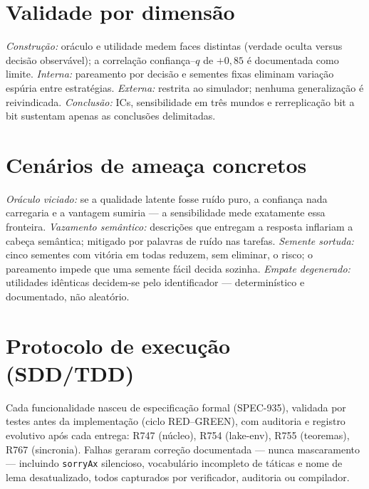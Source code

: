 \section{Validade por dimensão}
\textit{Construção:} oráculo e utilidade medem faces distintas (verdade oculta versus decisão observável); a correlação confiança--$q$ de $+0{,}85$ é documentada como limite. \textit{Interna:} pareamento por decisão e sementes fixas eliminam variação espúria entre estratégias. \textit{Externa:} restrita ao simulador; nenhuma generalização é reivindicada. \textit{Conclusão:} ICs, sensibilidade em três mundos e rerreplicação bit a bit sustentam apenas as conclusões delimitadas.
\section{Cenários de ameaça concretos}
\textit{Oráculo viciado:} se a qualidade latente fosse ruído puro, a confiança nada carregaria e a vantagem sumiria --- a sensibilidade mede exatamente essa fronteira. \textit{Vazamento semântico:} descrições que entregam a resposta inflariam a cabeça semântica; mitigado por palavras de ruído nas tarefas. \textit{Semente sortuda:} cinco sementes com vitória em todas reduzem, sem eliminar, o risco; o pareamento impede que uma semente fácil decida sozinha. \textit{Empate degenerado:} utilidades idênticas decidem-se pelo identificador --- determinístico e documentado, não aleatório.
\section{Protocolo de execução (SDD/TDD)}
Cada funcionalidade nasceu de especificação formal (SPEC-935), validada por testes antes da implementação (ciclo RED--GREEN), com auditoria e registro evolutivo após cada entrega: R747 (núcleo), R754 (lake-env), R755 (teoremas), R767 (sincronia). Falhas geraram correção documentada --- nunca mascaramento --- incluindo 	\texttt{sorryAx} silencioso, vocabulário incompleto de táticas e nome de lema desatualizado, todos capturados por verificador, auditoria ou compilador.
